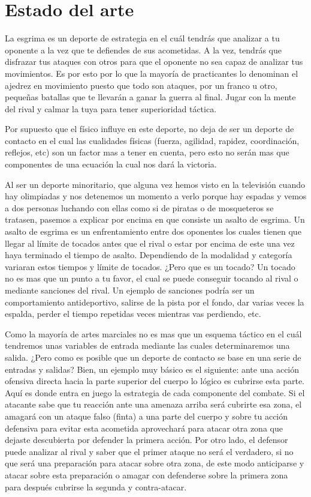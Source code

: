 \chapter{Estado del arte}
\label{cap:Estado del arte}

La esgrima es un deporte de estrategia en el cuál tendrás que analizar a tu
 oponente a la vez que te defiendes de sus acometidas. A la vez, tendrás que
 disfrazar tus ataques con otros para que el oponente no sea capaz de analizar
 tus movimientos. Es por esto por lo que la mayoría de practicantes lo denominan
 el ajedrez en movimiento puesto que todo son ataques, por un franco u otro,
 pequeñas batallas que te llevarán a ganar la guerra al final. Jugar con la mente
 del rival y calmar la tuya para tener superioridad táctica.

Por supuesto que el físico influye en este deporte, no deja de ser un deporte de contacto
 en el cual las cualidades físicas (fuerza, agilidad, rapidez, coordinación, reflejos, etc)
 son un factor mas a tener en cuenta, pero esto no serán mas que componentes de una ecuación
 la cual nos dará la victoria.

Al ser un deporte minoritario, que alguna vez hemos visto en la televisión cuando hay
 olimpiadas y nos detenemos un momento a verlo porque hay espadas y vemos a dos personas
 luchando con ellas como si de piratas o de mosqueteros se tratasen, pasemos a explicar por encima
 en que consiste un asalto de esgrima. Un asalto de esgrima es un enfrentamiento entre dos
 oponentes los cuales tienen que llegar al límite de tocados antes que el rival o estar por encima
 de este una vez haya terminado el tiempo de asalto. Dependiendo de la modalidad y categoría
 variaran estos tiempos y límite de tocados. ¿Pero que es un tocado? Un tocado no es mas que
 un punto a tu favor, el cual se puede conseguir tocando al rival o mediante sanciones del rival.
 Un ejemplo de sanciones podría ser un comportamiento antideportivo, salirse de la pista por el fondo,
 dar varias veces la espalda, perder el tiempo repetidas veces mientras vas perdiendo, etc.

Como la mayoría de artes marciales no es mas que un esquema táctico en el cuál tendremos unas variables
 de entrada mediante las cuales determinaremos una salida. ¿Pero como es posible que un deporte de contacto
 se base en una serie de entradas y salidas? Bien, un ejemplo muy básico es el siguiente: ante una acción ofensiva
 directa hacia la parte superior del cuerpo lo lógico es cubrirse esta parte. Aquí es donde entra en juego
 la estrategia de cada componente del combate. Si el atacante sabe que tu reacción ante una amenaza arriba
 será cubrirte esa zona, el amagará con un ataque falso (finta) a una parte del cuerpo y sobre tu acción
 defensiva para evitar esta acometida aprovechará para atacar otra zona que dejaste descubierta por
 defender la primera acción. Por otro lado, el defensor puede analizar al rival y saber que el primer ataque
 no será el verdadero, si no que será una preparación para atacar sobre otra zona, de este modo anticiparse
 y atacar sobre esta preparación o amagar con defenderse sobre la primera zona para después cubrirse la segunda
 y contra-atacar.

